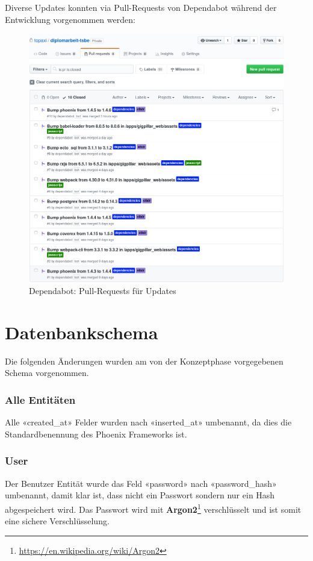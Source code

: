 \clearpage
Diverse Updates konnten via Pull-Requests von Dependabot während der Entwicklung
vorgenommen werden:

\begin{figure}[!htb]
  \centering
  \includegraphics[width=1\textwidth]{realisierung/dependabot-updates-cropped.png}
  \caption{Dependabot: Pull-Requests für Updates}
\end{figure}

\clearpage
\section{Datenbankschema}\label{RealisierungsSchema}

Die folgenden Änderungen wurden am von der Konzeptphase vorgegebenen Schema
vorgenommen.

\subsubsection{Alle Entitäten}
Alle «created\_at» Felder wurden nach «inserted\_at» umbenannt, da dies die
Standardbenennung des Phoenix Frameworks ist.

\subsubsection{User}
Der Benutzer Entität wurde das Feld «password» nach «password\_hash» umbenannt,
damit klar ist, dass nicht ein Passwort sondern nur ein Hash abgespeichert wird.
Das Passwort wird mit \textbf{Argon2}\footnote{\url{https://en.wikipedia.org/wiki/Argon2}}
verschlüsselt und ist somit eine sichere Verschlüsselung.

